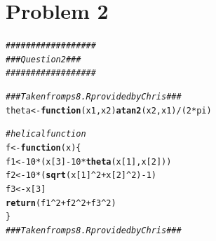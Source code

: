 \documentclass{article}\usepackage[]{graphicx}\usepackage[]{color}
\makeatletter
\newcommand{\hlnum}[1]{\textcolor[rgb]{0.686,0.059,0.569}{#1}}%
\newcommand{\hlcom}[1]{\textcolor[rgb]{0.678,0.584,0.686}{\textit{#1}}}%
\newcommand{\hlopt}[1]{\textcolor[rgb]{0,0,0}{#1}}%
\newcommand{\hlstd}[1]{\textcolor[rgb]{0.345,0.345,0.345}{#1}}%
\newcommand{\hlkwa}[1]{\textcolor[rgb]{0.161,0.373,0.58}{\textbf{#1}}}%
\newcommand{\hlkwb}[1]{\textcolor[rgb]{0.69,0.353,0.396}{#1}}%
\newcommand{\hlkwc}[1]{\textcolor[rgb]{0.333,0.667,0.333}{#1}}%
\newcommand{\hlkwd}[1]{\textcolor[rgb]{0.737,0.353,0.396}{\textbf{#1}}}%
\newenvironment{kframe}{%
 \def\at@end@of@kframe{}%
 \ifinner\ifhmode%
  \def\at@end@of@kframe{\end{minipage}}%
  \begin{minipage}{\columnwidth}%
 \fi\fi%
 \def\FrameCommand##1{\hskip\@totalleftmargin \hskip-\fboxsep
 \colorbox{shadecolor}{##1}\hskip-\fboxsep
     \hskip-\linewidth \hskip-\@totalleftmargin \hskip\columnwidth}%
 \MakeFramed {\advance\hsize-\width
   \@totalleftmargin\z@ \linewidth\hsize
   \@setminipage}}%
 {\par\unskip\endMakeFramed%
 \at@end@of@kframe}
\newenvironment{knitrout}{}{} %
\makeatother
\begin{document}
\section{Problem 2}
\begin{knitrout}
\color{fgcolor}\begin{kframe}
\begin{alltt}
\hlcom{##################}
\hlcom{### Question 2 ###}
\hlcom{##################}

\hlcom{### Taken from ps8.R provided by Chris ###}
\hlstd{theta} \hlkwb{<-} \hlkwa{function}\hlstd{(}\hlkwc{x1}\hlstd{,}\hlkwc{x2}\hlstd{)} \hlkwd{atan2}\hlstd{(x2, x1)}\hlopt{/}\hlstd{(}\hlnum{2}\hlopt{*}\hlstd{pi)}

\hlcom{#helical function}
\hlstd{f} \hlkwb{<-} \hlkwa{function}\hlstd{(}\hlkwc{x}\hlstd{) \{}
  \hlstd{f1} \hlkwb{<-} \hlnum{10}\hlopt{*}\hlstd{(x[}\hlnum{3}\hlstd{]} \hlopt{-} \hlnum{10}\hlopt{*}\hlkwd{theta}\hlstd{(x[}\hlnum{1}\hlstd{],x[}\hlnum{2}\hlstd{]))}
  \hlstd{f2} \hlkwb{<-} \hlnum{10}\hlopt{*}\hlstd{(}\hlkwd{sqrt}\hlstd{(x[}\hlnum{1}\hlstd{]}\hlopt{^}\hlnum{2} \hlopt{+} \hlstd{x[}\hlnum{2}\hlstd{]}\hlopt{^}\hlnum{2}\hlstd{)} \hlopt{-} \hlnum{1}\hlstd{)}
  \hlstd{f3} \hlkwb{<-} \hlstd{x[}\hlnum{3}\hlstd{]}
  \hlkwd{return}\hlstd{(f1}\hlopt{^}\hlnum{2} \hlopt{+} \hlstd{f2}\hlopt{^}\hlnum{2} \hlopt{+} \hlstd{f3}\hlopt{^}\hlnum{2}\hlstd{)}
\hlstd{\}}
\hlcom{### Taken from ps8.R provided by Chris ###}


\end{alltt}
\end{kframe}
\end{knitrout}
\end{document}
